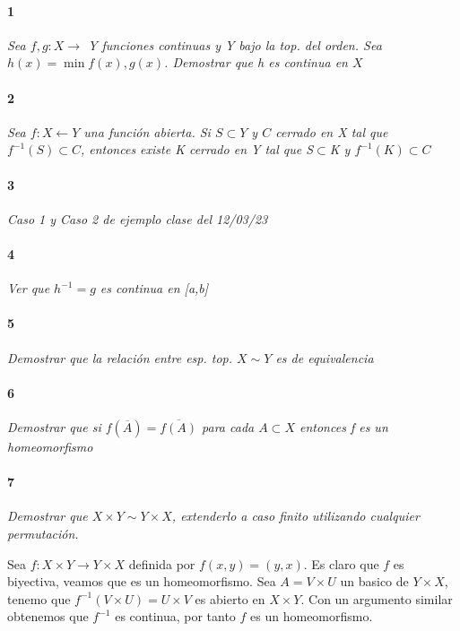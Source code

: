 \documentclass[12pt]{article}
\author{Alumnos: \\Arturo Rodriguez Contreras - 2132880 \\
Jonathan Raymundo Torres Cardenas - 1949731\\
Praxedis Jimenes Ruvalcaba \\
Erick Román Montemayor Treviño - 1957959 \\
Alexis Noe Mora Leyva \\
Everardo Flores Rivera - 2127301}
\begin{document}
\maketitle

\paragraph{1}
\textit{Sea $f,g:X\rightarrow$ Y funciones continuas y Y bajo la top. del orden. Sea $h(x)=\min{f(x),g(x)}$. Demostrar que h es continua en $X$}

\paragraph{2}
\textit{Sea $f:X\leftarrow Y$ una función abierta. Si $S \subset Y$ y $C$ cerrado en X tal que $f^{-1}(S)\subset C$, entonces existe K cerrado en Y tal que S$\subset$K y $f^{-1}(K)\subset C$}

\paragraph{3}
\textit{Caso 1 y Caso 2 de ejemplo clase del 12/03/23} 


\paragraph{4}
\textit{Ver que $h^{-1}=g$ es continua en [a,b]}

\paragraph{5}
\textit{Demostrar que la relación entre esp. top. $X\sim Y$ es de equivalencia}

\paragraph{6}
\textit{Demostrar que si $f(\overline{A})=\overline{f(A)}$ para cada $A\subset X$ entonces f es un homeomorfismo}

\paragraph{7}
\textit{Demostrar que $X\times Y \sim Y \times X$, extenderlo a caso finito utilizando cualquier permutación.}

Sea $f: X \times Y \to Y \times X$ definida por $f(x,y)=(y,x)$. Es claro que $f$ es biyectiva, veamos que es un homeomorfismo. Sea $A=V \times U$ un basico de $Y \times X$, 
tenemo que $f^{-1}(V \times U)=U \times V$ es abierto en $X \times Y$. Con un argumento similar obtenemos que $f^{-1}$ es continua, por tanto $f$ es un homeomorfismo.
\end{document}
